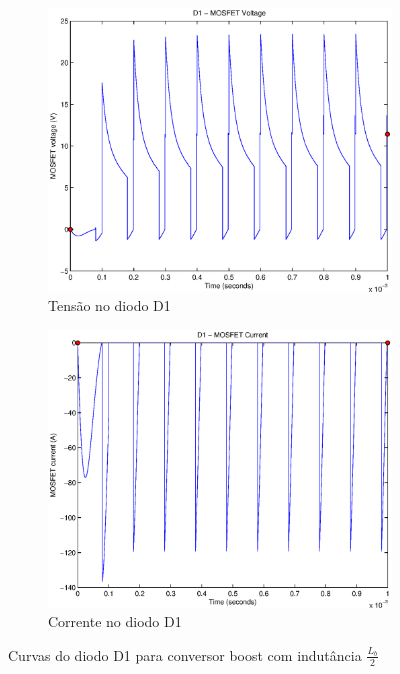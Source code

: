 \documentclass{article}
\begin{document}
\begin{figure}[H]
	\centering
	\begin{subfigure}[b]{0.4\linewidth}
		\includegraphics[width=\linewidth]{matlab/boost/r_d1v2}
		\caption{Tensão no diodo D1}
	\end{subfigure}
	\begin{subfigure}[b]{0.4\linewidth}
		\centering
		\includegraphics[width=\linewidth]{matlab/boost/r_d1i2}
		\caption{Corrente no diodo D1}
	\end{subfigure}
	\caption{Curvas do diodo D1 para conversor boost com indutância $\frac{L_b}{2}$}
	\label{fig:bod12}
\end{figure}

%
\end{document}
